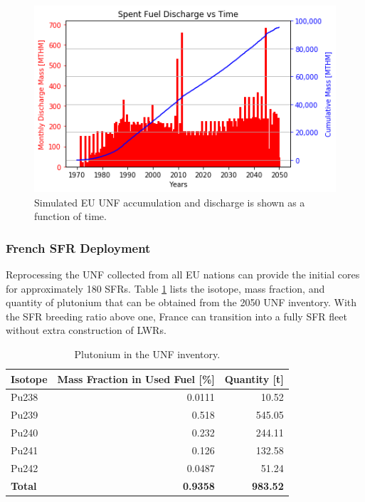 \documentclass{article}
\begin{document}
\begin{figure}[htbp!]
    \begin{center}
            \includegraphics[scale=0.7]{./images/eu_future/snf_discharge.png}
    \end{center}
        \caption{Simulated \gls{EU} \gls{UNF} accumulation and discharge is 
shown as a function of time.}
    \label{fig:eu_snf}
\end{figure}


\subsubsection{French \gls{SFR} Deployment}
\FloatBarrier

Reprocessing the \gls{UNF} collected from all EU nations can provide the 
initial cores for approximately 180 \glspl{SFR}. Table \ref{tab:pu} lists the 
isotope, mass fraction, and quantity of plutonium that can be obtained from the 
2050 \gls{UNF} inventory.  With the \gls{SFR} breeding ratio above one, France 
can transition into a fully \gls{SFR} fleet without extra construction of 
\glspl{LWR}. 

\begin{table}[h]
    \centering
    \caption{Plutonium in the \gls{UNF} inventory.}
    \begin{tabular}{lrr}
        \hline
        \textbf{Isotope} & \textbf{Mass Fraction in Used Fuel [\%]} & \textbf{Quantity [t]} \\ \hline
        Pu238 & 0.0111 & 10.52 \\ 
        Pu239 & 0.518 & 545.05 \\ 
        Pu240 & 0.232 & 244.11 \\ 
        Pu241 & 0.126 & 132.58 \\ 
        Pu242 & 0.0487 & 51.24 \\ \hline
        \textbf{Total} & \textbf{0.9358} & \textbf{983.52} \\ \hline
    \end{tabular}
    
    \label{tab:pu}
\end{table}
\end{document}
